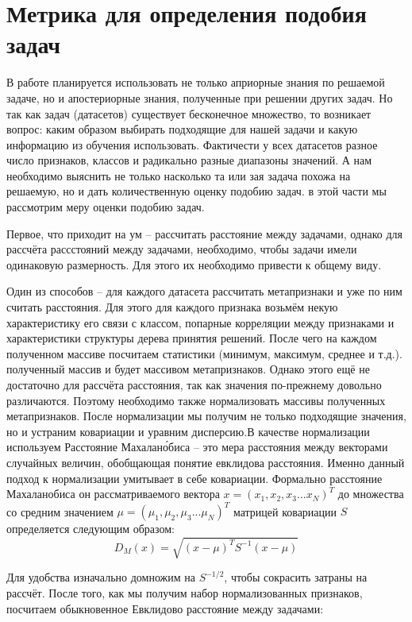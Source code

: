 \documentclass[times,specification,annotation]{itmo-student-thesis}
\begin{document}
	\section{Метрика для определения подобия задач} \label{s:metrics}
	В работе планируется использовать не только априорные знания по решаемой задаче, но и апостериорные знания, полученные при решении других задач. Но так как задач (датасетов) существует бесконечное множество, то возникает вопрос: каким образом выбирать подходящие для нашей задачи и какую информацию из обучения использовать. Фактичести у всех датасетов разное число признаков, классов и радикально разные диапазоны значений. А нам необходимо выяснить не только насколько та или зая задача похожа на решаемую, но и дать количественную оценку подобию задач. в этой части мы рассмотрим меру оценки подобию задач. \par
	Первое, что приходит на ум -- рассчитать расстояние между задачами, однако для рассчёта рассстояний между задачами, необходимо, чтобы задачи имели одинаковую размерность. Для этого их необходимо привести к общему виду. \par 
	Один из способов -- для каждого датасета рассчитать метапризнаки\cite{jomaa2019dataset2vec} и уже по ним считать расстояния. Для этого для каждого признака возьмём некую характеристику его связи с классом, попарные корреляции между признаками и характеристики структуры дерева принятия решений. После чего на каждом полученном массиве посчитаем статистики (минимум, максимум, среднее и т.д.). полученный массив и будет массивом метапризнаков. Однако этого ещё не достаточно для рассчёта расстояния, так как значения по-прежнему довольно различаются. Поэтому необходимо также нормализовать массивы полученных метапризнаков. После нормализации мы получим не только подходящие значения, но и устраним ковариации и уравним дисперсию.В качестве нормализации используем Расстояние Махалан\'обиса -- это мера расстояния между векторами случайных величин, обобщающая понятие евклидова расстояния. Именно данный подход к нормализации умитывает в себе ковариации. Формально расстояние Махаланобиса он рассматриваемого вектора $ x=(x_{1},x_{2},x_{3}...x_{N})^{T} $ до множества со средним значением $ \mu=(\mu_{1},\mu_{2},\mu_{3}...\mu_{N})^{T} $ матрицей ковариации $ S $ определяется следующим образом:
	\begin{equation}
	\mathit D_{M}(x)=\sqrt{(x-\mu)^{T}S^{-1}(x-\mu)}
	\label{eq:meh}
	\end{equation}\par
	Для удобства изначально домножим на $ S^{-1/2} $, чтобы сокрасить затраны на рассчёт. После того, как мы получим набор нормализованных признаков, посчитаем обыкновенное Евклидово расстояние между задачами:
\end{document}
